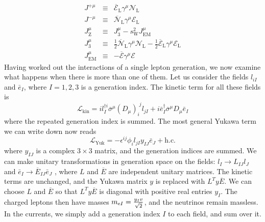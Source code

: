 \begin{eqnarray}
J^{+\mu} &\equiv & \overline{\mathcal{E}}_{\mathrm{L}} \gamma^{\mu} \mathcal{N}_{\mathrm{L}} \nonumber \\
J^{-\mu} &\equiv & \overline{\mathcal{N}}_{\mathrm{L}} \gamma^{\mu} \mathcal{E}_{\mathrm{L}} \nonumber \\
J_{\mathrm{Z}}^{\mu} &\equiv & J_3^{\mu} - s_{\mathrm{W}}^2 J^{\mu}_{\mathrm{EM}} \nonumber \\
J_3^{\mu} &\equiv & \frac{1}{2}\overline{\mathcal{N}}_{\mathrm{L}} \gamma^{\mu} \mathcal{N}_{\mathrm{L}} - \frac{1}{2}\overline{\mathcal{E}}_{\mathrm{L}} \gamma^{\mu} \mathcal{E}_{\mathrm{L}} \nonumber \\
J^{\mu}_{\mathrm{EM}} &\equiv &  -\overline{\mathcal{E}} \gamma^{\mu} \mathcal{E} \nonumber
\end{eqnarray}
Having worked out the interactions of a single lepton generation, we now examine what happens when there is more than one of them. 
Let us consider the fields $l_{iI}$ and $\bar{e}_{I}$, where $I=1,2,3$ is a generation index. The kinetic term for all these fields is
\[\mathcal{L}_{\mathrm{kin}} = il^{\dagger i}_I \overline{\sigma}^{\mu}(D_{\mu})_{i}^{\phantom{i}j} l_{jI} + i\bar{e}_I^{\dagger}\overline{\sigma}^{\mu}D_{\mu}\bar{e}_I\]
where the repeated generation index is summed. The most general Yukawa term we can write down now reads
\[\mathcal{L}_{\mathrm{Yuk}} = -\epsilon^{ij}\phi_i l_{jI}y_{IJ} \bar{e}_{J} + \mathrm{h.c.}\]
where $y_{IJ}$ is a complex $3 \times 3$ matrix, and the generation indices are summed.
We can make unitary transformations in generation space on the fields: $l_I \to L_{IJ} l_J$ and $\bar{e}_I \to \overline{E}_{IJ}\bar{e}_J$ , where $L$ and $\overline{E}$ are independent unitary matrices.
The kinetic terms are unchanged, and the Yukawa matrix $y$ is replaced with $L^T y \overline{E} $. We can choose $L$ and $\overline{E}$ so that $L^T y \overline{E}$ is diagonal with positive real entries $y_I$. The charged leptons then have masses $m_{{\rm e}I} = \frac{y_Iv}{\sqrt{2}}$, and the neutrinos remain massless. In the currents, we simply add a generation index $I$ to each field, and sum over it.

